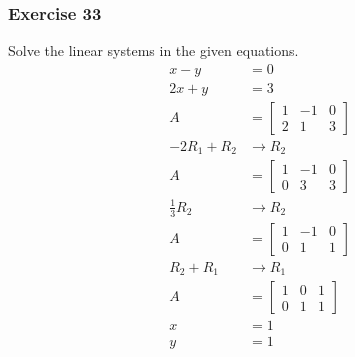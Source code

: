 \documentclass{math}
\begin{document}
\subsubsection*{Exercise 33}
Solve the linear systems in the given equations.
\begin{align*}
  x-y &= 0 \\
  2x+y &= 3 \\
  A &= \left[\begin{array}{cc|c}
    1 & -1 & 0 \\
    2 & 1 & 3
  \end{array}\right] \\
  -2R_1+R_2 &\to R_2 \\
  A &= \left[\begin{array}{cc|c}
    1 & -1 & 0 \\
    0 & 3 & 3
  \end{array}\right] \\
  \frac{1}{3}R_2 &\to R_2 \\
  A &= \left[\begin{array}{cc|c}
    1 & -1 & 0 \\
    0 & 1 & 1
  \end{array}\right] \\
  R_2+R_1 &\to R_1 \\
  A &= \left[\begin{array}{cc|c}
    1 & 0 & 1 \\
    0 & 1 & 1
  \end{array}\right] \\
  x &= 1 \\
  y &= 1
\end{align*}
\end{document}
